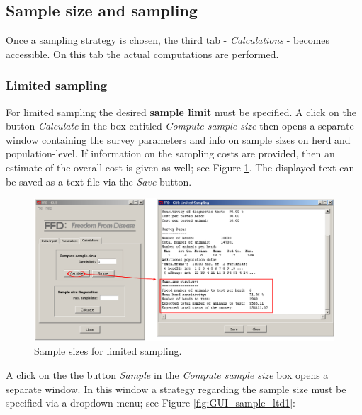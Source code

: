 \documentclass[nojss]{jss}
\begin{document}
\subsection{Sample size and sampling}
\label{subsec:GUI_sample size}

Once a sampling strategy is chosen, the third tab - \emph{Calculations} - becomes accessible. On this tab the actual computations are performed.

\subsubsection{Limited sampling}

For limited sampling the desired \textbf{sample limit} must be specified. A click on the button \emph{Calculate} in the box entitled \emph{Compute sample size} then opens a separate window containing the survey parameters and info on sample sizes on herd and population-level. If information on the sampling costs are provided, then an estimate of the overall cost is given as well; see Figure \ref{fig:GUI_cald_ltd}. The displayed text can be saved as a text file via the \emph{Save}-button.

\begin{figure}[h!t]
\begin{center}
\includegraphics[width=120mm]{GUI_calc_ltd.png}
\end{center}
\caption{Sample sizes for limited sampling.} \label{fig:GUI_cald_ltd}
\end{figure}

A click on the the button \emph{Sample} in the \emph{Compute sample size} box opens a separate window. In this window a strategy regarding the sample size must be specified via a dropdown menu; see Figure \ref{fig:GUI_sample_ltd1}:
\end{document}
